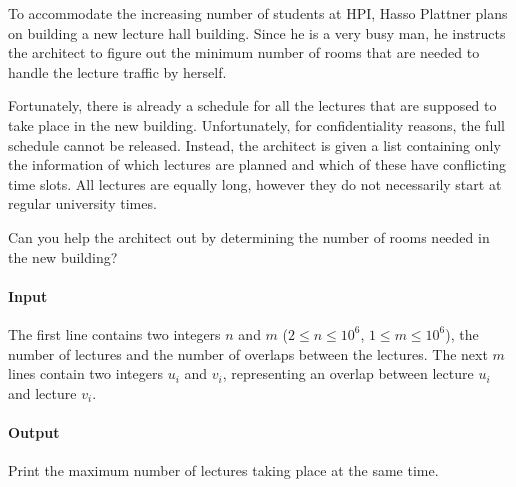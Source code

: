 



\makeheader

To accommodate the increasing number of students at HPI, Hasso Plattner plans on building a new lecture hall building. Since he is a very busy man, he instructs the architect to figure out the minimum number of rooms that are needed to handle the lecture traffic by herself.

Fortunately, there is already a schedule for all the lectures that are supposed to take place in the new building.
Unfortunately, for confidentiality reasons, the full schedule cannot be released. Instead, the architect is given a list containing only the information of which lectures are planned and which of these have conflicting time slots. All lectures are equally long, however they do not necessarily start at regular university times.

Can you help the architect out by determining the number of rooms needed in the new building?

\paragraph*{Input}

The first line contains two integers $n$ and $m$ ($2 \leq n \leq 10^6$, $1 \leq m \leq 10^6$), the number of lectures and the number of overlaps between the lectures. 
The next $m$ lines contain two integers $u_i$ and $v_i$, representing an overlap between lecture $u_i$ and lecture $v_i$. 

\paragraph*{Output}

Print the maximum number of lectures taking place at the same time.

\begin{samples}
\end{samples}


